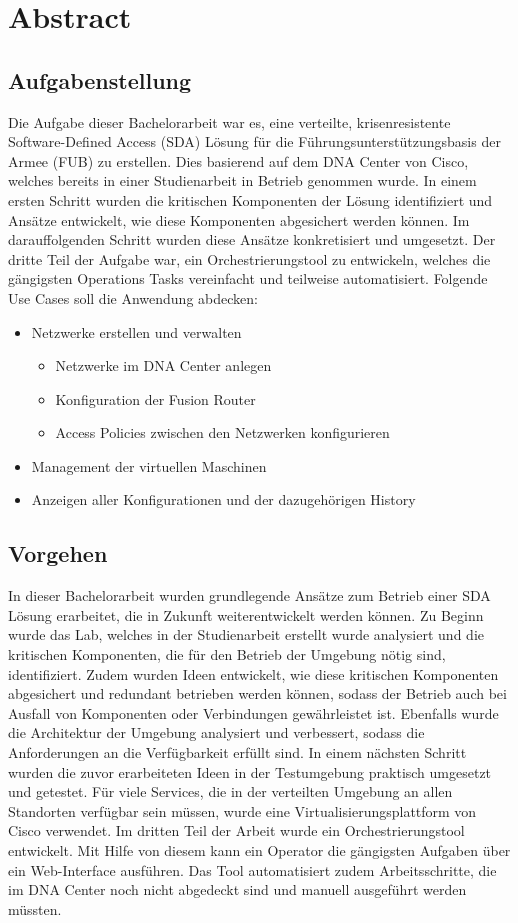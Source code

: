 \section{Abstract} 

\subsection{Aufgabenstellung} 
Die Aufgabe dieser Bachelorarbeit war es, eine verteilte, krisenresistente Software-Defined Access (SDA) Lösung für die Führungsunterstützungsbasis der Armee (FUB) zu erstellen. Dies basierend auf dem DNA Center von Cisco, welches bereits in einer Studienarbeit in Betrieb genommen wurde. In einem ersten Schritt wurden die kritischen Komponenten der Lösung identifiziert und Ansätze entwickelt, wie diese Komponenten abgesichert werden können. Im darauffolgenden Schritt wurden diese Ansätze konkretisiert und umgesetzt. Der dritte Teil der Aufgabe war, ein Orchestrierungstool zu entwickeln, welches die gängigsten Operations Tasks vereinfacht und teilweise automatisiert. Folgende Use Cases soll die Anwendung abdecken:
\begin{itemize}
	\item Netzwerke erstellen und verwalten
	\begin{itemize}
		\item Netzwerke im DNA Center anlegen
		\item Konfiguration der Fusion Router
		\item Access Policies zwischen den Netzwerken konfigurieren
	\end{itemize}
	\item Management der virtuellen Maschinen
	\item Anzeigen aller Konfigurationen und der dazugehörigen History
\end{itemize}


\subsection{Vorgehen}
In dieser Bachelorarbeit wurden grundlegende Ansätze zum Betrieb einer SDA Lösung erarbeitet, die in Zukunft weiterentwickelt werden können. Zu Beginn wurde das Lab, welches in der Studienarbeit erstellt wurde analysiert und die kritischen Komponenten, die für den Betrieb der Umgebung nötig sind, identifiziert. Zudem wurden Ideen entwickelt, wie diese kritischen Komponenten abgesichert und redundant betrieben werden können, sodass der Betrieb auch bei Ausfall von Komponenten oder Verbindungen gewährleistet ist. Ebenfalls wurde die Architektur der Umgebung analysiert und verbessert, sodass die Anforderungen an die Verfügbarkeit erfüllt sind. In einem nächsten Schritt wurden die zuvor erarbeiteten Ideen in der Testumgebung praktisch umgesetzt und getestet. Für viele Services, die in der verteilten Umgebung an allen Standorten verfügbar sein müssen, wurde eine Virtualisierungsplattform von Cisco verwendet. Im dritten Teil der Arbeit wurde ein Orchestrierungstool entwickelt. Mit Hilfe von diesem kann ein Operator die gängigsten Aufgaben über ein Web-Interface ausführen. Das Tool automatisiert zudem Arbeitsschritte, die im DNA Center noch nicht abgedeckt sind und manuell ausgeführt werden müssten. 

